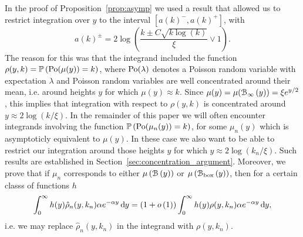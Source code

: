 In the proof of Proposition~\ref{prop:asymp} we used a result that allowed us to restrict integration over $y$ to the interval $[a(k)^-, a(k)^+]$, with
\[
	a(k)^\pm = 2\log\left(\frac{k \pm C \sqrt{k \log(k)}}{\xi} \vee 1\right).
\]
The reason for this was that the integrand included the function $\rho(y,k) = \mathbb{P}\left({\mathrm{Po}}(\mu(y)) = k\right)$, where ${\mathrm{Po}}(\lambda)$ denotes a Poisson random variable with expectation $\lambda$ and Poisson random variables are well concentrated around their mean, i.e. around heights $y$ for which $\mu(y) \approx k$. Since $\mu(y) = \mu({\mathcal B}_{\infty}\left(y\right)) = \xi e^{y/2}$, this implies that integration with respect to $\rho(y,k)$ is concentrated around $y \approx 2\log(k/\xi)$. In the remainder of this paper we will often encounter integrands involving the function $\mathbb{P}\left({\mathrm{Po}}(\mu_n(y)) = k\right)$, for some $\mu_n(y)$ which is asymptoticly equivalent to $\mu(y)$. In these case we also want to be able to restrict our integration around those heights $y$ for which $y \approx 2\log(k_n/\xi)$. Such results are established in Section~\ref{sec:concentration_argument}. Moreover, we prove that if $\mu_n$ corresponds to either $\mu\left({\mathcal B}\left(y\right)\right)$ or $\mu\left({\mathcal B}_{\text{box}}\left(y\right)\right)$, then for a certain classs of functions $h$
\[
	\int_0^\infty h(y) \hat{\rho}_n(y,k_n) \alpha e^{-\alpha y} \operatorname{\mathrm{d}\hspace{-2pt}} y 
	= (1+o\left(1\right)) \int_0^\infty h(y) \rho(y,k_n) \alpha e^{-\alpha y} \operatorname{\mathrm{d}\hspace{-2pt}} y,
\]
i.e. we may replace $\hat{\rho}_n(y,k_n)$ in the integrand with $\rho(y,k_n)$.

